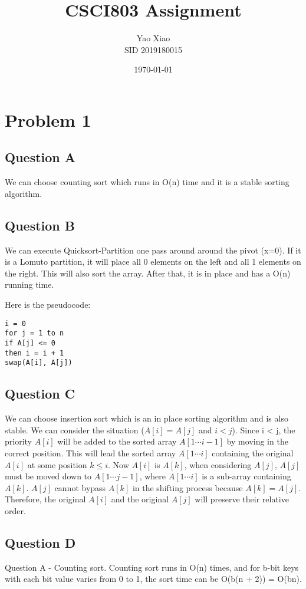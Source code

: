 \documentclass{article}
\title{CSCI803 Assignment}
\author{Yao Xiao \\ SID 2019180015}
\date{\today}
\begin{document}
\maketitle

\section{Problem 1}
\subsection{Question A}
We can choose counting sort which runs in O(n) time and it is a stable sorting algorithm. 

\subsection{Question B}
We can execute Quicksort-Partition one pass around around the pivot (x=0).
If it is a Lomuto partition, it will place all 0 elements on the left and all 1 elements on the right.
This will also sort the array.
After that, it is in place and has a O(n) running time.

Here is the pseudocode:
\begin{lstlisting}
i = 0
for j = 1 to n
if A[j] <= 0
then i = i + 1
swap(A[i], A[j])
\end{lstlisting}

\subsection{Question C}
We can choose insertion sort which is an in place sorting algorithm and is also stable.
We can consider the situation ($A[i] = A[j]$ and $i < j$).
Since i < j, the priority $A[i]$  will be added to the sorted array $A[1\cdots i-1]$ by moving in the correct position.
This will lead the sorted array $A[1\cdots i]$ containing the original $A[i]$ at some position $ k \leq i$.
Now $A[i]$ is $A[k]$, when considering $A[j]$, $A[j]$ must be moved down to $A[1\cdots j-1]$, where $A[1\cdots i]$ is a sub-array containing $A[k]$.
$A[j]$ cannot bypass $A[k]$ in the shifting process because $A[k] = A[j]$. Therefore, the original $A[i]$ and the original $A[j]$ will preserve their relative order.

\subsection{Question D}
Question A - Counting sort. Counting sort runs in O(n) times, and for b-bit keys with
each bit value varies from 0 to 1, the sort time can be O(b(n + 2)) = O(bn). 
\end{document}

